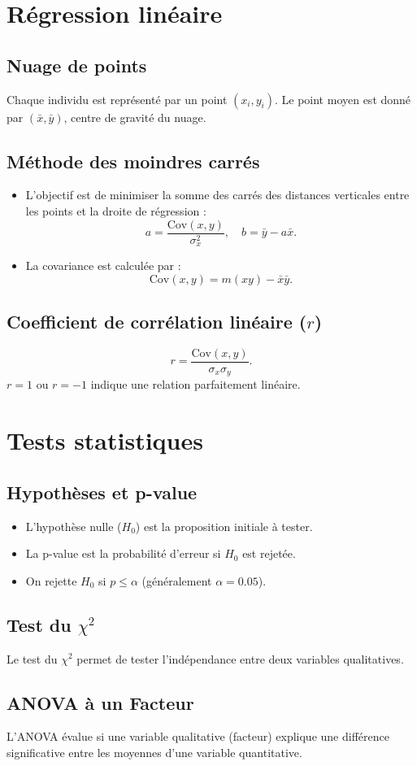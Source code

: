 \documentclass[a4paper,12pt]{article}
\begin{document}
\section*{Régression linéaire}

\subsection*{Nuage de points}
Chaque individu est représenté par un point $(x_i, y_i)$. Le point moyen est donné par $(\bar{x}, \bar{y})$, centre de gravité du nuage.

\subsection*{Méthode des moindres carrés}
\begin{itemize}
    \item L’objectif est de minimiser la somme des carrés des distances verticales entre les points et la droite de régression :
    \[
    a = \frac{\text{Cov}(x, y)}{\sigma_x^2}, \quad b = \bar{y} - a\bar{x}.
    \]
    \item La covariance est calculée par :
    \[
    \text{Cov}(x, y) = m(xy) - \bar{x} \bar{y}.
    \]
\end{itemize}

\subsection*{Coefficient de corrélation linéaire ($r$)}
\[
r = \frac{\text{Cov}(x, y)}{\sigma_x \sigma_y}.
\]
$r = 1$ ou $r = -1$ indique une relation parfaitement linéaire.

\section*{Tests statistiques}

\subsection*{Hypothèses et p-value}
\begin{itemize}
    \item L’hypothèse nulle ($H_0$) est la proposition initiale à tester.
    \item La p-value est la probabilité d’erreur si $H_0$ est rejetée.
    \item On rejette $H_0$ si $p \leq \alpha$ (généralement $\alpha = 0.05$).
\end{itemize}

\subsection*{Test du $\chi^2$}
Le test du $\chi^2$ permet de tester l’indépendance entre deux variables qualitatives.

\subsection*{ANOVA à un Facteur}
L’ANOVA évalue si une variable qualitative (facteur) explique une différence significative entre les moyennes d’une variable quantitative.
\end{document}

